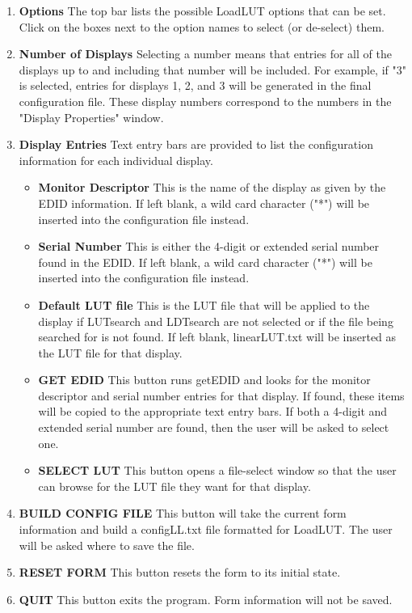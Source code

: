 \begin{enumerate}
	\item \textbf{Options} The top bar lists the possible LoadLUT options that can be set. Click on the boxes next to the option names to select (or de-select) them.
	\item \textbf{Number of Displays} Selecting a number means that entries for all of the displays up to and including that number will be included. For example, if "3" is selected, entries for displays 1, 2, and 3 will be generated in the final configuration file. These display numbers correspond to the numbers in the "Display Properties" window.
	\item \textbf{Display Entries} Text entry bars are provided to list the configuration information for each individual display.
	\begin{itemize}
		\item[] \textbf{Monitor Descriptor} This is the name of the display as given by the EDID information. If left blank, a wild card character ("*") will be inserted into the configuration file instead.
		\item[] \textbf{Serial Number} This is either the 4-digit or extended serial number found in the EDID. If left blank, a wild card character ("*") will be inserted into the configuration file instead. 
		\item[] \textbf{Default LUT file} This is the LUT file that will be applied to the display if LUTsearch and LDTsearch are not selected or if the file being searched for is not found. If left blank, \textnormal{linearLUT.txt} will be inserted as the LUT file for that display.
		\item[] \textbf{GET EDID} This button runs getEDID and looks for the monitor descriptor and serial number entries for that display. If found, these items will be copied to the appropriate text entry bars. If both a 4-digit and extended serial number are found, then the user will be asked to select one.
		\item[] \textbf{SELECT LUT} This button opens a file-select window so that the user can browse for the LUT file they want for that display.
	\end{itemize}
	\item \textbf{BUILD CONFIG FILE} This button will take the current form information and build a configLL.txt file formatted for LoadLUT. The user will be asked where to save the file.
	\item \textbf{RESET FORM} This button resets the form to its initial state.
	\item \textbf{QUIT} This button exits the program. Form information will not be saved.
\end{enumerate}

%